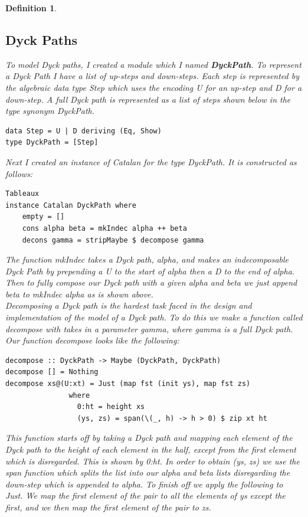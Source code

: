 \documentclass[12pt]{article}
\newtheorem{definition}{Definition}
\begin{document}
\begin{definition}
\subsection{Dyck Paths}
To model Dyck paths, I created a module which I named {\bf DyckPath}. To represent a Dyck Path I have a list of up-steps and down-steps. Each step is represented by the algebraic data type Step which uses the encoding U for an up-step and D for a down-step. A full Dyck path is represented as a list of steps shown below in the type synonym DyckPath.
\begin{lstlisting}
data Step = U | D deriving (Eq, Show)
type DyckPath = [Step]
\end{lstlisting}
Next I created an instance of Catalan for the type DyckPath. It is constructed as follows:
\begin{lstlisting}Tableaux
instance Catalan DyckPath where
	empty = []
	cons alpha beta = mkIndec alpha ++ beta 
	decons gamma = stripMaybe $ decompose gamma
\end{lstlisting}
The function {\it mkIndec} takes a Dyck path, alpha, and makes an indecomposable Dyck Path by prepending a U to the start of alpha then a D to the end of alpha. Then to fully compose our Dyck path with a given alpha and beta we just append beta to mkIndec alpha as is shown above.\\
Decomposing a Dyck path is the hardest task faced in the design and implementation of the model of a Dyck path. To do this we make a function called {\it decompose} with takes in a parameter gamma, where gamma is a full Dyck path. Our function decompose looks like the following:
\begin{lstlisting}
decompose :: DyckPath -> Maybe (DyckPath, DyckPath)
decompose [] = Nothing
decompose xs@(U:xt) = Just (map fst (init ys), map fst zs) 
               where
                 0:ht = height xs 
                 (ys, zs) = span(\(_, h) -> h > 0) $ zip xt ht
\end{lstlisting}
This function starts off by taking a Dyck path and mapping each element of the Dyck path to the height of each element in the half, except from the first element which is disregarded. This is shown by 0:ht. In order to obtain (ys, zs) we use the span function which splits the list into our alpha and beta lists disregarding the down-step which is appended to alpha. To finish off we apply the following to {\it Just}. We map the first element of the pair to all the elements of ys except the first, and we then map the first element of the pair to zs.\\

\end{definition}
\end{document}
